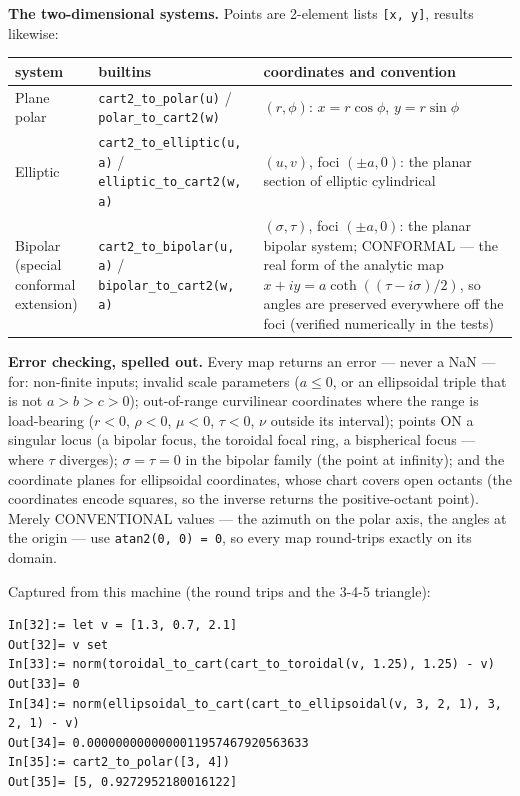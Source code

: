 \documentclass[11pt]{article}
\newcommand{\code}[1]{\texttt{#1}}
\begin{document}
\textbf{The two-dimensional systems.} Points are 2-element lists
\code{[x, y]}, results likewise:

\begin{center}\small
\begin{tabular}{p{2.2cm}p{4.6cm}p{7.8cm}}
\textbf{system} & \textbf{builtins} & \textbf{coordinates and convention}\\\hline
Plane polar & \code{cart2\_to\_polar(u)} / \code{polar\_to\_cart2(w)}
  & $(r, \phi)$: $x = r\cos\phi$, $y = r\sin\phi$\\
Elliptic & \code{cart2\_to\_elliptic(u, a)} /
  \code{elliptic\_to\_cart2(w, a)} & $(u, v)$, foci $(\pm a, 0)$: the
  planar section of elliptic cylindrical\\
Bipolar (special conformal extension) & \code{cart2\_to\_bipolar(u, a)} /
  \code{bipolar\_to\_cart2(w, a)} & $(\sigma, \tau)$, foci
  $(\pm a, 0)$: the planar bipolar system; CONFORMAL --- the real form
  of the analytic map $x + iy = a\coth((\tau - i\sigma)/2)$, so angles
  are preserved everywhere off the foci (verified numerically in the
  tests)\\
\end{tabular}
\end{center}

\textbf{Error checking, spelled out.} Every map returns an error ---
never a NaN --- for: non-finite inputs; invalid scale parameters
($a \le 0$, or an ellipsoidal triple that is not $a > b > c > 0$);
out-of-range curvilinear coordinates where the range is load-bearing
($r < 0$, $\rho < 0$, $\mu < 0$, $\tau < 0$, $\nu$ outside its
interval); points ON a singular locus (a bipolar focus, the toroidal
focal ring, a bispherical focus --- where $\tau$ diverges);
$\sigma = \tau = 0$ in the bipolar family (the point at infinity); and
the coordinate planes for ellipsoidal coordinates, whose chart covers
open octants (the coordinates encode squares, so the inverse returns
the positive-octant point). Merely CONVENTIONAL values --- the azimuth
on the polar axis, the angles at the origin --- use
\code{atan2(0, 0) = 0}, so every map round-trips exactly on its
domain.

Captured from this machine (the round trips and the 3-4-5 triangle):

\begin{lstlisting}
In[32]:= let v = [1.3, 0.7, 2.1]
Out[32]= v set
In[33]:= norm(toroidal_to_cart(cart_to_toroidal(v, 1.25), 1.25) - v)
Out[33]= 0
In[34]:= norm(ellipsoidal_to_cart(cart_to_ellipsoidal(v, 3, 2, 1), 3, 2, 1) - v)
Out[34]= 0.0000000000000011957467920563633
In[35]:= cart2_to_polar([3, 4])
Out[35]= [5, 0.9272952180016122]
\end{lstlisting}
\end{document}
